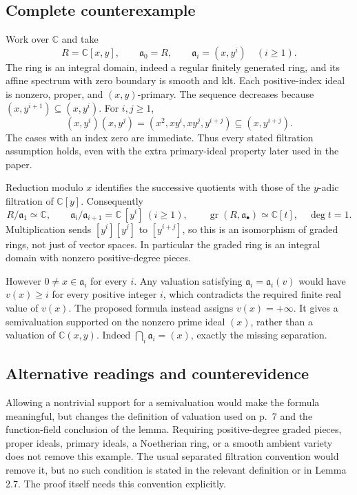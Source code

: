 \documentclass[10pt]{article}
\begin{document}
\subsection*{Complete counterexample}
Work over \(\mathbb C\) and take \[R=\mathbb C[x,y],\qquad \mathfrak a_0=R,\qquad
 \mathfrak a_i=(x,y^i)\quad(i\geq1).\] The ring is an integral domain, indeed a regular finitely generated ring, and its affine spectrum with zero boundary is smooth and klt. Each positive-index ideal is nonzero, proper, and \((x,y)\)-primary. The sequence decreases because \((x,y^{i+1})\subseteq(x,y^i)\). For \(i,j\geq1\), \[(x,y^i)(x,y^j)
  =(x^2,xy^i,xy^j,y^{i+j})\subseteq(x,y^{i+j}).\] The cases with an index zero are immediate. Thus every stated filtration assumption holds, even with the extra primary-ideal property later used in the paper.\par
Reduction modulo \(x\) identifies the successive quotients with those of the \(y\)-adic filtration of \(\mathbb C[y]\). Consequently \[R/\mathfrak a_1\simeq\mathbb C,\qquad
 \mathfrak a_i/\mathfrak a_{i+1}=\mathbb C\,[y^i]\ (i\geq1),\qquad
 \operatorname{gr}(R,\mathfrak a_\bullet)\simeq\mathbb C[t],\quad \deg t=1.\] Multiplication sends \([y^i][y^j]\) to \([y^{i+j}]\), so this is an isomorphism of graded rings, not just of vector spaces. In particular the graded ring is an integral domain with nonzero positive-degree pieces.\par
However \(0\ne x\in\mathfrak a_i\) for every \(i\). Any valuation satisfying \(\mathfrak a_i=\mathfrak a_i(v)\) would have \(v(x)\geq i\) for every positive integer \(i\), which contradicts the required finite real value of \(v(x)\). The proposed formula instead assigns \(v(x)=+\infty\). It gives a semivaluation supported on the nonzero prime ideal \((x)\), rather than a valuation of \(\mathbb C(x,y)\). Indeed \(\bigcap_i\mathfrak a_i=(x)\), exactly the missing separation.\par
\subsection*{Alternative readings and counterevidence}
Allowing a nontrivial support for a semivaluation would make the formula meaningful, but changes the definition of valuation used on p. 7 and the function-field conclusion of the lemma. Requiring positive-degree graded pieces, proper ideals, primary ideals, a Noetherian ring, or a smooth ambient variety does not remove this example. The usual separated filtration convention would remove it, but no such condition is stated in the relevant definition or in Lemma 2.7. The proof itself needs this convention explicitly.\par
\end{document}
